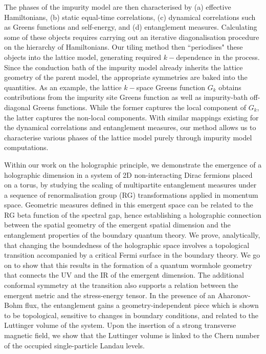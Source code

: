 The phases of the impurity model are then characterised by (a) effective Hamiltonians, (b) static equal-time correlations, (c) dynamical correlations such as Greens functions and self-energy, and (d) entanglement measures. Calculating some of these objects requires carrying out an iterative diagonalisation procedure on the hierarchy of Hamiltonians. Our tiling method then ``periodises" these objects into the lattice model, generating required $k-$dependence in the process. Since the conduction bath of the impurity model already inherits the lattice geometry of the parent model, the appropriate symmetries are baked into the quantities. As an example, the lattice $k-$space Greens function \(G_k\) obtains contributions from the impurity site Greens function as well as impurity-bath off-diagonal Greens functions. While the former captures the local component of \(G_k\), the latter captures the non-local components. With similar mappings existing for the dynamical correlations and entanglement measures, our method allows us to characterise various phases of the lattice model purely through impurity model computations. 

Within our work on the holographic principle, we demonstrate the emergence of a holographic dimension in a system of 2D non-interacting Dirac fermions placed on a torus, by studying the scaling of multipartite entanglement measures under a sequence of renormalisation group (RG) transformations applied in momentum space. Geometric measures defined in this emergent space can be related to the RG beta function of the spectral gap, hence establishing a holographic connection between the spatial geometry of the emergent spatial dimension and the entanglement properties of the boundary quantum theory. We prove, analytically, that changing the boundedness of the holographic space involves a topological transition accompanied by a critical Fermi surface in the boundary theory. We go on to show that this results in the formation of a quantum wormhole geometry that connects the UV and the IR of the emergent dimension. The additional conformal symmetry at the transition also supports a relation between the emergent metric and the stress-energy tensor. In the presence of an Aharonov-Bohm flux, the entanglement gains a geometry-independent piece which is shown to be topological, sensitive to changes in boundary conditions, and related to the Luttinger volume of the system. Upon the insertion of a strong transverse magnetic field, we show that the Luttinger volume is linked to the Chern number of the occupied single-particle Landau levels.

